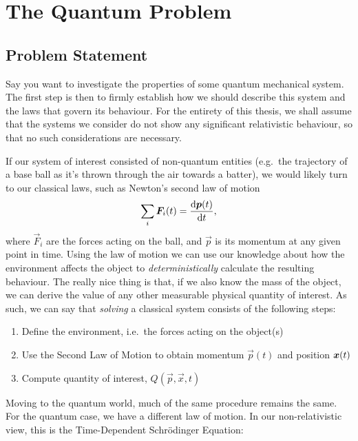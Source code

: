 \documentclass[Thesis.tex]{subfiles}
\begin{document}
\chapter{The Quantum Problem}
\label{chp:the-quantum-problem}


\section{Problem Statement}

Say you want to investigate the properties of some quantum
mechanical system. The first step is then to firmly establish how we should describe this
system and the laws that govern its behaviour. For the entirety of this thesis, we shall
assume that the systems we consider do not show any significant relativistic behaviour, so
that no such considerations are necessary.

If our system of interest consisted of non-quantum entities (e.g.\ the
trajectory of a base ball as it's thrown through the air towards a batter), we
would likely turn to our classical laws, such as Newton's second law of motion
%
\begin{align}
    \sum_i \bm{F}_i(t) = \dv{\bm{p}(t)}{t},
\end{align}
%
\noindent where $\vec F_i$ are the forces acting on the ball, and $\vec p$ is its momentum at
any given point in time. Using the law of motion we can use our knowledge about how the
environment affects the object to \emph{deterministically} calculate the resulting
behaviour. The really nice thing is that, if we also know the mass of the object, we
can derive the value of any other measurable physical quantity of interest. As such,
we can say that \emph{solving} a classical system consists of the following steps:

\begin{enumerate}
    \item Define the environment, i.e.\ the forces acting on the object(s)
    \item Use the Second Law of Motion to obtain momentum $\vec p(t)$ and position $\bm{x}(t)$
    \item Compute quantity of interest, $Q(\vec p, \vec x, t)$
\end{enumerate}

Moving to the quantum world, much of the same procedure remains the same. For the quantum
case, we have a different law of motion. In our non-relativistic view, this is the
Time-Dependent Schrödinger Equation:
\end{document}
